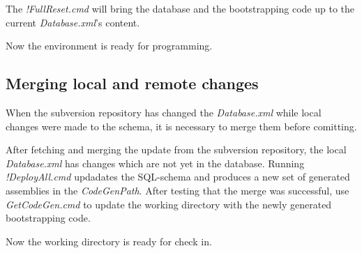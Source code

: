 The \emph{!FullReset.cmd} will bring the database and the bootstrapping
code up to the current \emph{Database.xml}'s content.

Now the environment is ready for programming.

\subsection{Merging local and remote changes}

When the subversion repository has changed the \emph{Database.xml} while
local changes were made to the schema, it is necessary to merge them
before comitting.

After fetching and merging the update from the subversion repository,
the local \emph{Database.xml} has changes which are not yet in the
database. Running \emph{!DeployAll.cmd} updadates the SQL-schema and
produces a new set of generated assemblies in the \emph{CodeGenPath}.
After testing that the merge was successful, use \emph{GetCodeGen.cmd}
to update the working directory with the newly generated bootstrapping
code.

Now the working directory is ready for check in.




